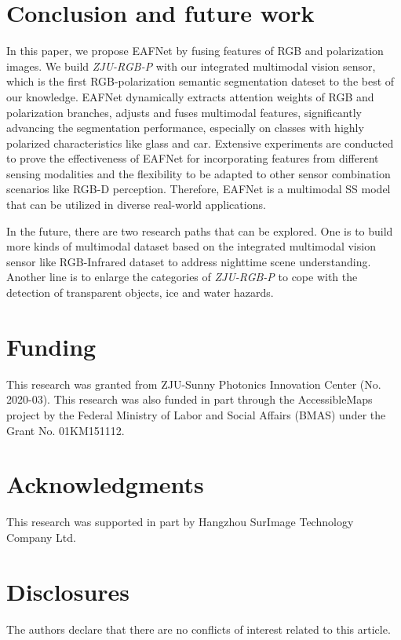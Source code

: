 \documentclass{osa-article}
\begin{document}
\section{Conclusion and future work}
In this paper, we propose EAFNet by fusing features of RGB and polarization images. We build \textit{ZJU-RGB-P} with our integrated multimodal vision sensor, which is the first RGB-polarization semantic segmentation dateset to the best of our knowledge.
EAFNet dynamically extracts attention weights of RGB and polarization branches, adjusts and fuses multimodal features, significantly advancing the segmentation performance, especially on classes with highly polarized characteristics like glass and car.
Extensive experiments are conducted to prove the effectiveness of EAFNet for incorporating features from different sensing modalities and the flexibility to be adapted to other sensor combination scenarios like RGB-D perception.
Therefore, EAFNet is a multimodal SS model that can be utilized in diverse real-world applications.

In the future, there are two research paths that can be explored.
One is to build more kinds of multimodal dataset based on the integrated multimodal vision sensor like RGB-Infrared dataset to address nighttime scene understanding.
Another line is to enlarge the categories of \textit{ZJU-RGB-P} to cope with the detection of transparent objects, ice and water hazards.

\section*{Funding}
This research was granted from ZJU-Sunny Photonics Innovation Center (No. 2020-03). This research was also funded in part through the AccessibleMaps project by the Federal Ministry of Labor and Social Affairs (BMAS) under the Grant No. 01KM151112.

\section*{Acknowledgments}
This research was supported in part by Hangzhou SurImage Technology Company Ltd.

\section*{Disclosures}
The authors declare that there are no conflicts of interest related to this article.



\end{document}
